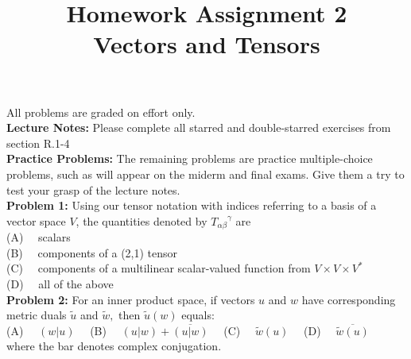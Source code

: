 \documentclass[12pt]{article}
\begin{document}
\date{\vspace{-5ex}}

\title{Homework Assignment 2 \\ Vectors and Tensors}

\maketitle

\noindent
All problems are graded on effort only.\\

\noindent
{\bf Lecture Notes:}  Please complete all starred and double-starred exercises from section R.1-4\\


\noindent
{\bf Practice Problems:} The remaining problems are practice
multiple-choice problems, such as will appear on the miderm and final
exams.  Give them a try to test your grasp of the lecture notes.\\[3pt]

\noindent
{\bf Problem 1:} Using our tensor notation with indices referring to a basis of a vector space $V$, the quantities denoted by 
${T_{\alpha \beta}}^{\gamma}$ are\\[5pt]
(A) ~~scalars\\[3pt]
(B) ~~components of a (2,1) tensor\\[3pt]
(C) ~~components of a multilinear scalar-valued function from $V \times V \times V^*$\\[3pt]
(D) ~~all of the above\\[5pt]

\noindent
{\bf Problem 2:} For an inner product space, if vectors $u$ and $w$ have corresponding metric duals $\tilde{u}$ and $\tilde{w},$
then $\tilde{u}(w)$ equals:\\[3pt]
(A) ~~$(w|u)$~~
(B) ~~$(u|w) + \overline{(u|w)}$~~
(C) ~~$\tilde{w}(u)$~~
(D) ~~$\overline{\tilde{w}(u)}$\\[3pt]
where the bar denotes complex conjugation.\\[5pt]
\end{document}
